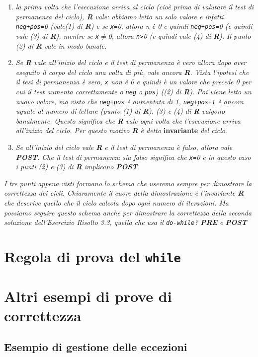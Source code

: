 \begin{enumerate}


\item
\textit{la prima volta che l'esecuzione arriva al ciclo (cioè prima di valutare il test di permanenza del ciclo), \textbf{R} vale:
abbiamo letto un solo valore e infatti \texttt{neg+pos=}0 (vale(1) di \textbf{R}) e se \texttt{x=}0, allora \textit{n} è 0 e quindi \texttt{neg+pos=}0 (e quindi vale (3) di \textbf{R}), mentre se \texttt{x$\neq$}0, allora \texttt{n>}0 (e quindi vale (4) di \textbf{R}).
Il punto (2) di \textbf{R} vale in modo banale.}

\item
\textit{Se \textbf{R} vale all'inizio del ciclo e il test di permanenza è vero allora dopo aver eseguito il corpo del ciclo una volta di più, vale ancora \textbf{R}.
Vista l'ipotesi che il tesi di permanenza è vero, \texttt{x} non è 0 e quindi è un valore che precede 0 per cui il test aumenta correttamente o \texttt{neg} o \texttt{pos}) ((2) di \textbf{R}).
Poi viene letto un nuovo valore, ma visto che \texttt{neg+pos} è aumentata di 1, \texttt{neg+pos+1} è ancora uguale al numero di letture (punto (1) di \textbf{R}).
(3) e (4) di \textbf{R} valgono banalmente.
Questo significa che \textbf{R} vale ogni volta che l'esecuzione arriva all'inizio del ciclo.
Per questo motivo \textbf{R} è detto} \textbf{invariante} \textit{del ciclo}.

\item
\textit{Se all'inizio del ciclo vale \textbf{R} e il test di permanenza è falso, allora vale \textbf{POST}.
Che il test di permanenza sia falso significa che \texttt{x=}0 e in questo caso i punti (2) e (3) di \textbf{R} implicano \textbf{POST}.}

\end{enumerate}

\textit{I tre punti appena visti formano lo schema che useremo sempre per dimostrare la correttezza dei cicli.
Chiaramente il cuore della dimostrazione è l'invariante \textbf{R} che descrive quello che il ciclo calcola dopo ogni numero di iterazioni.
Ma possiamo seguire questo schema anche per dimostrare la correttezza della seconda soluzione 
dell'Esercizio Risolto 3.3, quella che usa il \texttt{do-while}?
\textbf{PRE} e \textbf{POST}}



\section{Regola di prova del \texttt{while}}

\section{Altri esempi di prove di correttezza}

\subsection{Esempio di gestione delle eccezioni}

